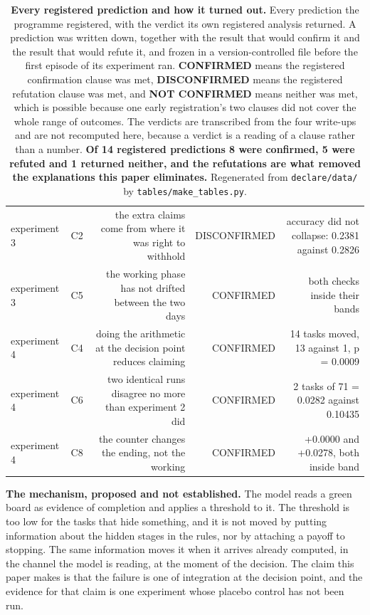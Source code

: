 \documentclass[11pt]{article}
\begin{document}
\begin{table}[t]
\begin{tabularx}{\textwidth}{L{0.667}L{0.278}R{1.666}R{0.722}R{1.667}}
experiment 3 & C2 & the extra claims come from where it was right to withhold & DISCONFIRMED & accuracy did not collapse: 0.2381 against 0.2826 \\
experiment 3 & C5 & the working phase has not drifted between the two days & CONFIRMED & both checks inside their bands \\
experiment 4 & C4 & doing the arithmetic at the decision point reduces claiming & CONFIRMED & 14 tasks moved, 13 against 1, p = 0.0009 \\
experiment 4 & C6 & two identical runs disagree no more than experiment 2 did & CONFIRMED & 2 tasks of 71 = 0.0282 against 0.10435 \\
experiment 4 & C8 & the counter changes the ending, not the working & CONFIRMED & +0.0000 and +0.0278, both inside band \\
\bottomrule
\end{tabularx}
\caption{\textbf{Every registered prediction and how it turned out.} Every prediction the programme registered, with the verdict its own registered analysis returned. A prediction was written down, together with the result that would confirm it and the result that would refute it, and frozen in a version-controlled file before the first episode of its experiment ran. \textbf{CONFIRMED} means the registered confirmation clause was met, \textbf{DISCONFIRMED} means the registered refutation clause was met, and \textbf{NOT CONFIRMED} means neither was met, which is possible because one early registration's two clauses did not cover the whole range of outcomes. The verdicts are transcribed from the four write-ups and are not recomputed here, because a verdict is a reading of a clause rather than a number. \textbf{Of 14 registered predictions 8 were confirmed, 5 were refuted and 1 returned neither, and the refutations are what removed the explanations this paper eliminates.} Regenerated from \texttt{declare/data/} by \texttt{tables/make\_tables.py}.}
\label{tab:T8}
\end{table}

\textbf{The mechanism, proposed and not established.} The model reads a green board as evidence of completion and applies a threshold to it. The threshold is too low for the tasks that hide something, and it is not moved by putting information about the hidden stages in the rules, nor by attaching a payoff to stopping. The same information moves it when it arrives already computed, in the channel the model is reading, at the moment of the decision. The claim this paper makes is that the failure is one of integration at the decision point, and the evidence for that claim is one experiment whose placebo control has not been run.
\end{document}
